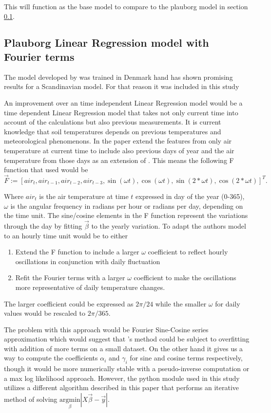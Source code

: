 This will function as the base model to compare to the plauborg model in section \ref{sec:theory:pluborg}.

\subsection[Plauborg Regression]{Plauborg Linear Regression model with Fourier terms}\label{sec:theory:pluborg}
The model developed by \cite{plauborg_simple_2002} was trained in Denmark hand has shown promising results for a Scandinavian model. For that reason it was included in this study 

An improvement over an time independent Linear Regression model would be a time dependent Linear Regression model that takes not only current time into account of the calculations but also previous measurements. It is current knowledge that soil temperatures depends on previous temperatures and meteorological phenomenons. In the paper \citeauthor{plauborg_simple_2002} \cite{plauborg_simple_2002} extend the features from only air temperature at current time to include also previous days of year and the air temperature from those days as an extension of \cite{roodenburg_estimating_1985}. This means the following F function that \citeauthor{plauborg_simple_2002} used would be 
$$
\vec{F} := [air_t , air_{t-1}, air_{t-2}, air_{t-3}, \sin(\omega t) , \cos(\omega t), \sin(2*\omega t), \cos(2*\omega t)]^T.
$$

Where $air_t$ is the air temperature at time $t$ expressed in day of the year (0-365), $\omega$ is the angular frequency in radians per hour or radians per day, depending on the time unit. The sine/cosine elements in the F function represent the variations through the day by fitting $\vec{\beta}$ to the yearly variation. To adapt the authors model to an hourly time unit would be to either
\begin{enumerate}
	\item Extend the F function to include a larger $\omega$ coefficient to reflect hourly oscillations in conjunction with daily fluctuation
	\item Refit the Fourier terms with a larger $\omega$ coefficient to make the oscillations more representative of daily temperature changes.
\end{enumerate}

The larger coefficient could be expressed as $2\pi/24$ while the smaller $\omega$ for daily values would be rescaled to $2\pi/365$.

The problem with this approach would be Fourier Sine-Cosine series approximation which would suggest that \citeauthor{plauborg_simple_2002}'s method could be subject to overfitting with addition of more terms on a small dataset. On the other hand it gives us a way to compute the coefficients $\alpha_i$ and $\gamma_i$ for sine and cosine terms respectively, though it would be more numerically stable with a pseudo-inverse computation or a max log likelihood approach. However, the python module used in this study utilizes a different algorithm described in this paper \cite{van_benthem_fast_2004} that performs an iterative method of solving $\underset{\beta}{\text{argmin}} \left|X\vec{\beta} - \vec{y}\right|$.

